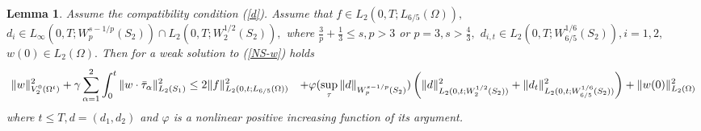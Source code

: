 \documentclass{amsart}
\theoremstyle{plain}
\newtheorem{lemma}{Lemma}
\begin{document}
\begin{lemma} \label{l-weak}
Assume the compatibility condition (\ref{d}). Assume that $f \in
L_2(0,T;L_{6/5}({\Omega})),$ $d_i \in L_{\infty}(0,T; W^{s-1/p}_p(S_2))
\cap L_2(0,T;W^{1/2}_2(S_2)),$ where $\frac{3}{p} +\frac{1}{3} \le
s, p>3 $ or $p=3, s> \frac{4}{3},$ $d_{i,t} \in
L_2(0,T;W^{1/6}_{6/5}(S_2)), i=1,2,$ $w(0) \in L_2({\Omega}).$ Then for
a weak solution to (\ref{NS-w}) holds \begin{eqnarray} \label{est-1} \begin{aligned} &
\|w\|^2_{V^0_2({\Omega}^t)} + {\gamma} \sum_{{\alpha}=1}^2 \int_0^t
\|w\cdot\bar{\tau}_{\alpha}\|_{L_2(S_1)}^2 \le 2
\|f\|^2_{L_2(0,t;L_{6/5}({\Omega}))}
{\hfil\break} &
+{\varphi}(\sup_{\tau}\|d\|_{W^{s-1/p}_p(S_2)})\left(\|d\|_{L_2(0,t;W^{1/2}_2(S_2))}^2
+ \|d_t\|_{L_2(0,t;W^{1/6}_{6/5}(S_2))}^2\right)+
\|w(0)\|_{L_2({\Omega})}^2 \end{aligned} \end{eqnarray} where $t\le T, d=(d_1, d_2)$ and
${\varphi}$ is a nonlinear positive increasing function of its argument.
\end{lemma}
\end{document}
